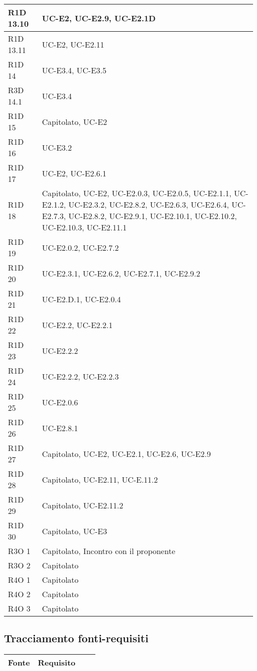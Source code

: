 \begin{center}
\begin{longtable}{ | l | p{8cm} | }
    R1D 13.10 & UC-E2, UC-E2.9, UC-E2.1D \\ \hline
    R1D 13.11 & UC-E2, UC-E2.11 \\ \hline
    R1D 14 &  UC-E3.4, UC-E3.5\\ \hline
    R3D 14.1 & UC-E3.4 \\ \hline
    R1D 15 & Capitolato, UC-E2  \\ \hline
    R1D 16 & UC-E3.2 \\ \hline
    R1D 17 & UC-E2, UC-E2.6.1 \\ \hline
    R1D 18 & Capitolato, UC-E2, UC-E2.0.3, UC-E2.0.5, UC-E2.1.1, UC-E2.1.2, UC-E2.3.2, UC-E2.8.2, UC-E2.6.3, UC-E2.6.4, UC-E2.7.3, UC-E2.8.2, UC-E2.9.1, UC-E2.10.1, UC-E2.10.2, UC-E2.10.3, UC-E2.11.1 \\ \hline
    R1D 19 & UC-E2.0.2, UC-E2.7.2 \\ \hline
    R1D 20 & UC-E2.3.1, UC-E2.6.2, UC-E2.7.1, UC-E2.9.2 \\ \hline
    R1D 21 & UC-E2.D.1, UC-E2.0.4 \\ \hline
    R1D 22 & UC-E2.2, UC-E2.2.1 \\ \hline
    R1D 23 & UC-E2.2.2 \\ \hline
    R1D 24 & UC-E2.2.2, UC-E2.2.3  \\ \hline
    R1D 25 & UC-E2.0.6  \\ \hline
    R1D 26 & UC-E2.8.1 \\ \hline
    R1D 27 & Capitolato, UC-E2, UC-E2.1, UC-E2.6, UC-E2.9 \\ \hline
    R1D 28 & Capitolato, UC-E2.11, UC-E.11.2 \\ \hline
    R1D 29 & Capitolato, UC-E2.11.2 \\ \hline
    R1D 30 & Capitolato, UC-E3 \\ \hline
    R3O 1 & Capitolato, Incontro con il proponente\\ \hline
    R3O 2 & Capitolato \\ \hline
    R4O 1 & Capitolato \\ \hline
    R4O 2 & Capitolato \\ \hline
    R4O 3 & Capitolato \\ \hline
    \end{longtable}
  \egroup
\end{center} 

\subsection{Tracciamento fonti-requisiti}

\begin{center}
  \bgroup
  \def\arraystretch{1.8}
  \begin{longtable}{ | l | p{2cm} | p{4.7cm} | p{2cm} |}
    \hline
    \cellcolor[gray]{0.9} \textbf{Fonte} &   
    \cellcolor[gray]{0.9} \textbf{Requisito}\\ \hline
    \end{longtable}
  \egroup
\end{center}
